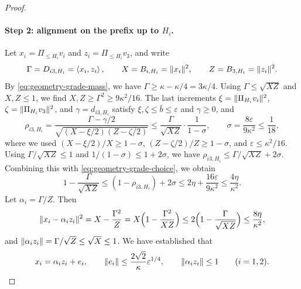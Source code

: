\begin{proof}
\paragraph{Step 2: alignment on the prefix up to $H_i$.}
Let $x_i=\Pi_{\le H_i}v_i$ and $z_i=\Pi_{\le H_i}v_3$, and write
\[
 \Gamma=D_{i3,H_i}=\left\langle x_i,z_i\right\rangle,\qquad X=B_{i,H_i}=\lVert x_i\rVert^2,\qquad Z=B_{3,H_i}=\lVert z_i\rVert^2 .
\]
By \eqref{eq:geometry-grade-mass}, we have $\Gamma\ge\kappa-\kappa/4=3\kappa/4$. Using $\Gamma\le\sqrt{XZ}$ and $X,Z\le1$, we find $X,Z\ge\Gamma^2\ge9\kappa^2/16$. The last increments $\xi=\lVert\Pi_{H_i}v_i\rVert^2$, $\zeta=\lVert\Pi_{H_i}v_3\rVert^2$, and $\gamma=d_{i3,H_i}$ satisfy $\xi,\zeta\le\bar b\le\varepsilon$ and $\gamma\ge0$, and
\[
 \rho_{i3,H_i}=\frac{\Gamma-\gamma/2}{\sqrt{(X-\xi/2)(Z-\zeta/2)}}\le\frac{\Gamma}{\sqrt{XZ}}\cdot\frac1{1-\sigma},
 \qquad \sigma=\frac{8\varepsilon}{9\kappa^2}\le\frac1{18},
\]
where we used $(X-\xi/2)/X\ge1-\sigma$, $(Z-\zeta/2)/Z\ge1-\sigma$, and $\varepsilon\le\kappa^2/16$. Using $\Gamma/\sqrt{XZ}\le1$ and $1/(1-\sigma)\le1+2\sigma$, we have $\rho_{i3,H_i}\le\Gamma/\sqrt{XZ}+2\sigma$. Combining this with \eqref{eq:geometry-grade-choice}, we obtain
\[
 1-\frac{\Gamma}{\sqrt{XZ}}\le(1-\rho_{i3,H_i})+2\sigma\le2\eta+\frac{16\varepsilon}{9\kappa^2}\le\frac{4\eta}{\kappa^2} .
\]
Let $\alpha_i=\Gamma/Z$. Then
\[
 \lVert x_i-\alpha_iz_i\rVert^2=X-\frac{\Gamma^2}Z=X\Bigl(1-\frac{\Gamma^2}{XZ}\Bigr)\le2\Bigl(1-\frac{\Gamma}{\sqrt{XZ}}\Bigr)\le\frac{8\eta}{\kappa^2},
\]
and $\lVert\alpha_iz_i\rVert=\Gamma/\sqrt Z\le\sqrt X\le1$. We have established that
\begin{equation}\label{eq:geometry-prefix-alignment}
 x_i=\alpha_iz_i+e_i,\qquad \lVert e_i\rVert\le\frac{2\sqrt2}{\kappa}\varepsilon^{1/4},\qquad\lVert\alpha_iz_i\rVert\le1\qquad(i=1,2).
\end{equation}


\end{proof}
